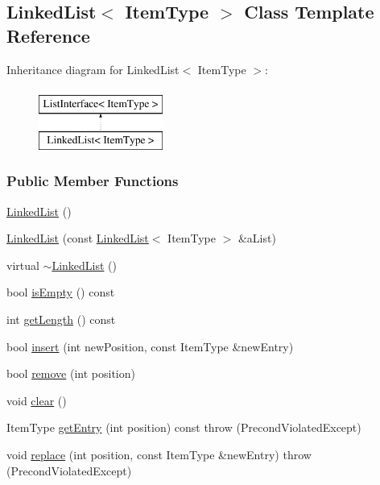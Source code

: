 \hypertarget{class_linked_list}{\subsection{Linked\-List$<$ Item\-Type $>$ Class Template Reference}
\label{class_linked_list}
}
Inheritance diagram for Linked\-List$<$ Item\-Type $>$\-:\begin{figure}[H]
\begin{center}
\leavevmode
\includegraphics[height=2.000000cm]{class_linked_list}
\end{center}
\end{figure}
\subsubsection*{Public Member Functions}
\begin{DoxyCompactItemize}
\item 
\hyperlink{class_linked_list_adf8d8164e06b6d358a36df7e53e814ee}{Linked\-List} ()
\item 
\hyperlink{class_linked_list_a6f1443c6120352f1f5b6bd3c0d95e41e}{Linked\-List} (const \hyperlink{class_linked_list}{Linked\-List}$<$ Item\-Type $>$ \&a\-List)
\item 
virtual \hyperlink{class_linked_list_a66aee17d756fe0e002375897383c180b}{$\sim$\-Linked\-List} ()
\item 
bool \hyperlink{class_linked_list_adb17aed0ceacbbe1f247d235f491f0d5}{is\-Empty} () const 
\item 
int \hyperlink{class_linked_list_adae55d6b79235c816cb9e05027fd2e7a}{get\-Length} () const 
\item 
bool \hyperlink{class_linked_list_ae8a19375505e87e2e4fc0e9b5afe4d4d}{insert} (int new\-Position, const Item\-Type \&new\-Entry)
\item 
bool \hyperlink{class_linked_list_a16a02716b5b2efb6fb1e3d18721b53e4}{remove} (int position)
\item 
void \hyperlink{class_linked_list_a7d1d9cf83eef67b6c4d700a3cc5970e1}{clear} ()
\item 
Item\-Type \hyperlink{class_linked_list_a79f005e696c19f6ccf90d9d535afa999}{get\-Entry} (int position) const   throw (\-Precond\-Violated\-Except)
\item 
void \hyperlink{class_linked_list_a3035f880c50e7d8f68e67c093d4607ca}{replace} (int position, const Item\-Type \&new\-Entry)  throw (\-Precond\-Violated\-Except)
\end{DoxyCompactItemize}
